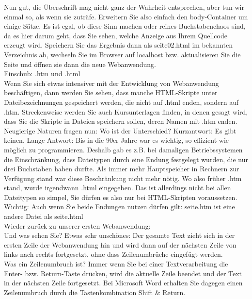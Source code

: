 Nun gut, die Überschrift mag nicht ganz der Wahrheit entsprechen, aber tun wir einmal so, als wenn sie zuträfe. Erweitern Sie also einfach den body-Container um einige Sätze. Es ist egal, ob diese Sinn machen oder reines Buchstabenchaos sind, da es hier darum geht, dass Sie sehen, welche Anzeige aus Ihrem Quellcode erzeugt wird. Speichern Sie das Ergebnis dann als seite02.html im bekannten Verzeichnis ab, wechseln Sie im Browser auf localhost bzw. aktualisieren Sie die Seite und öffnen sie dann die neue Webanwendung.\\

Einschub: .htm und .html\\

Wenn Sie sich etwas intensiver mit der Entwicklung von Webanwendung beschäftigen, dann werden Sie sehen, dass manche HTML-Skripte unter Dateibezeichnungen gespeichert werden, die nicht auf .html enden, sondern auf .htm. Streckenweise werden Sie auch Kursunterlagen finden, in denen gesagt wird, dass Sie die Skripte in Dateien speichern sollen, deren Namen mit .htm enden. Neugierige Naturen fragen nun: Wo ist der Unterschied? Kurzantwort: Es gibt keinen. Lange Antwort: Bis in die 90er Jahre war es wichtig, so effizient wie möglich zu programmieren. Deshalb gab es z.B. bei damaligen Betriebssystemen die Einschränkung, dass Dateitypen durch eine Endung festgelegt wurden, die nur drei Buchstaben haben durfte. Als immer mehr Hauptspeicher in Rechnern zur Verfügung stand war diese Beschränkung nicht mehr nötig. Wo also früher .htm stand, wurde irgendwann .html eingegeben. Das ist allerdings nicht bei allen Dateitypen so simpel, Sie dürfen es also nur bei HTML-Skripten voraussetzen.\\

Wichtig: Auch wenn Sie beide Endungen nutzen dürfen gilt: seite.htm ist eine andere Datei als seite.html\\

Wieder zurück zu unserer ersten Webanwendung:\\

Und was sehen Sie? Etwas sehr unschönes: Der gesamte Text zieht sich in der ersten Zeile der Webanwendung hin und wird dann auf der nächsten Zeile von links nach rechts fortgesetzt, ohne dass Zeilenumbrüche eingefügt werden.\\

Was ein Zeilenumbruch ist? Immer wenn Sie bei einer Textverarbeitung die Enter- bzw. Return-Taste drücken, wird die aktuelle Zeile beendet und der Text in der nächsten Zeile fortgesetzt. Bei Microsoft Word erhalten Sie dagegen einen Zeilenumbruch durch die Tastenkombination Shift \& Return.\\

